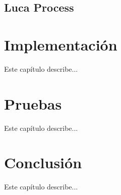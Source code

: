 \documentclass[a4paper,12pt]{book}
\begin{document}
		
		\section{Luca Process}
	
	\afterpage{\null\newpage}
	\newpage
	
	\chapter{Implementación}
	
	Este capítulo describe...
	
	\minitoc
	
	\afterpage{\null\newpage}
	\newpage
	
	
	\chapter{Pruebas}
	
	Este capítulo describe...
	
	\minitoc
	
	\afterpage{\null\newpage}
	\newpage
	
	
	
	\chapter{Conclusión}
	
	Este capítulo describe...
	
	\minitoc


	\clearpage
	
	
	
	
	\clearpage
\end{document}
